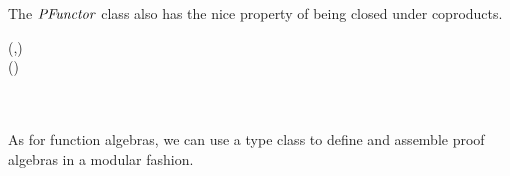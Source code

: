 The \ensuremath{\Conid{PFunctor}} class also has the nice property of being closed under
coproducts.
\begin{hscode}\SaveRestoreHook
{}%
%
%
%
%
%
%
%
%
\>[3]{}\;{}\<[13]%
\>[13]{}(\;,\;)\Rightarrow {}\<[E]%
\\
\>[13]{}\<[15]%
\>[15]{}\;(\oplus{})\;\<[E]%
\\
\>[3]{}\<[5]%
\>[5]{}\;\;\;\;\mathrel{=}{}\<[24]%
\>[24]{}\;\;\<[E]%
\\
\>[24]{}\<[26]%
\>[26]{}\;\<[34]%
\>[34]{}\to {}\;\;\;\<[E]%
\\
\>[24]{}\<[26]%
\>[26]{}\;\<[34]%
\>[34]{}\to {}\;\;\;\<[E]%
\ColumnHook
\end{hscode}\resethooks
As for function algebras, we can use a type class to define and
assemble proof algebras in a modular fashion.

